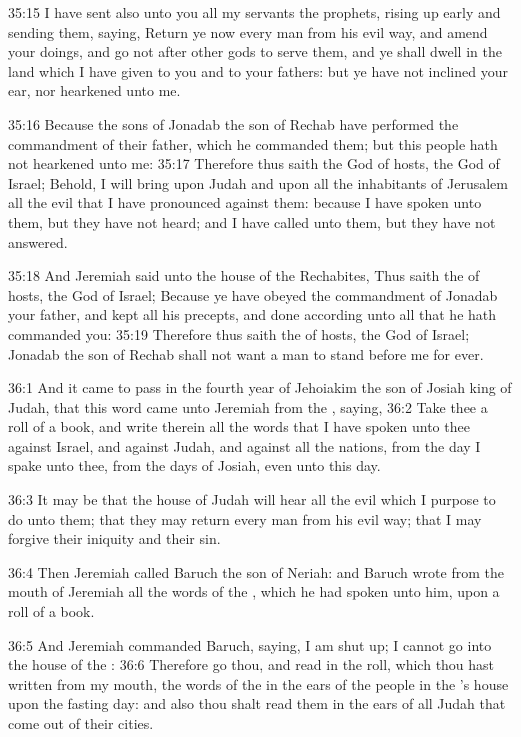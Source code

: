 35:15 I have sent also unto you all my servants the prophets, rising
up early and sending them, saying, Return ye now every man from his
evil way, and amend your doings, and go not after other gods to serve
them, and ye shall dwell in the land which I have given to you and to
your fathers: but ye have not inclined your ear, nor hearkened unto
me.

35:16 Because the sons of Jonadab the son of Rechab have performed the
commandment of their father, which he commanded them; but this people
hath not hearkened unto me: 35:17 Therefore thus saith the \LORD God of
hosts, the God of Israel; Behold, I will bring upon Judah and upon all
the inhabitants of Jerusalem all the evil that I have pronounced
against them: because I have spoken unto them, but they have not
heard; and I have called unto them, but they have not answered.

35:18 And Jeremiah said unto the house of the Rechabites, Thus saith
the \LORD of hosts, the God of Israel; Because ye have obeyed the
commandment of Jonadab your father, and kept all his precepts, and
done according unto all that he hath commanded you: 35:19 Therefore
thus saith the \LORD of hosts, the God of Israel; Jonadab the son of
Rechab shall not want a man to stand before me for ever.

36:1 And it came to pass in the fourth year of Jehoiakim the son of
Josiah king of Judah, that this word came unto Jeremiah from the \LORD,
saying, 36:2 Take thee a roll of a book, and write therein all the
words that I have spoken unto thee against Israel, and against Judah,
and against all the nations, from the day I spake unto thee, from the
days of Josiah, even unto this day.

36:3 It may be that the house of Judah will hear all the evil which I
purpose to do unto them; that they may return every man from his evil
way; that I may forgive their iniquity and their sin.

36:4 Then Jeremiah called Baruch the son of Neriah: and Baruch wrote
from the mouth of Jeremiah all the words of the \LORD, which he had
spoken unto him, upon a roll of a book.

36:5 And Jeremiah commanded Baruch, saying, I am shut up; I cannot go
into the house of the \LORD: 36:6 Therefore go thou, and read in the
roll, which thou hast written from my mouth, the words of the \LORD in
the ears of the people in the \LORD's house upon the fasting day: and
also thou shalt read them in the ears of all Judah that come out of
their cities.

